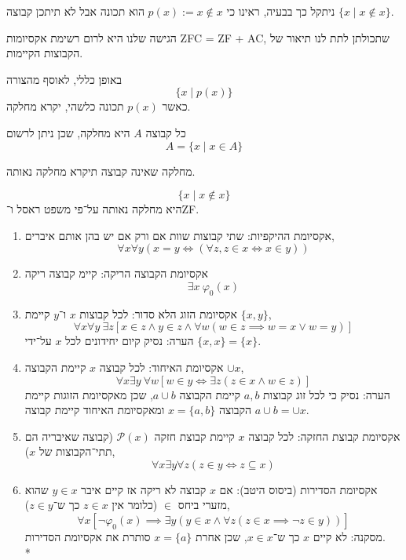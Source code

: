 ניתקל כך בבעיה, ראינו כי $p(x) := x \notin x$ הוא תכונה אבל לא תיתכן קבוצה $\{ x \mid x \notin x \}$.

הגישה שלנו היא לרום רשימת אקסיומות ZFC = ZF + AC, שתכולתן לתת לנו תיאור של הקבוצות הקיימות.
\begin{remark}
	באופן כללי, לאוסף מהצורה
	\[
		\{ x \mid p(x) \}
	\]
	כאשר $p(x)$ תכונה כלשהי, יקרא מחלקה.
\end{remark}
\begin{remark}
	כל קבוצה $A$ היא מחלקה, שכן ניתן לרשום
	\[
		A = \{ x \mid x \in A \}
	\]
\end{remark}
מחלקה שאינה קבוצה תיקרא מחלקה נאותה.
\begin{example}
	\[
		\{ x \mid x \notin x\}
	\]
	היא מחלקה נאותה על־פי משפט ראסל ו־ZF. %
\end{example}
\begin{definition}[המערכת ZF]
	\begin{enumerate}
		\item אקסיומת ההיקפיות:
			שתי קבוצות שוות אם ורק אם יש בהן אותם איברים,
			\[
				\forall x \forall y ( x = y \iff (\forall z, z \in x \iff x \in y))
			\]
		\item אקסיומת הקבוצה הריקה:
			קיימ קבוצה ריקה
			\[
				\exists x\ \varphi_0(x)
			\]
		\item אקסיומת הזוג הלא סדור:
			לכל קבוצות $x$ ו־$y$ קיימת $\{x, y\}$,
			\[
				\forall x \forall y \ \exists z [ x \in z \land y \in z \land \forall w (w \in z \implies w = x \lor w = y)]
			\]
			הערה: נסיק קיום יחידונים לכל $x$ על־ידי $\{ x, x \} = \{ x \}$.
		\item אקסיומת האיחוד:
			לכל קבוצה $x$ קיימת הקבוצה $\cup x$,
			\[
				\forall x \exists y \ \forall w [w \in y \iff \exists z (z \in x \land w \in z)]
			\]
			הערה: נסיק כי לכל זוג קבוצות $a, b$ קיימת הקבוצה $a \cup b$, שכן מאקסיומת הזוגות קיימת הקבוצה $x = \{ a, b \}$ ומאקסיומת האיחוד קיימת קבוצה $a \cup b = \cup x$.
		\item אקסיומת קבוצת החזקה:
			לכל קבוצה $x$ קיימת קבוצת חזקה $\mathcal{P}(x)$ (קבוצה שאיבריה הם תתי־הקבוצות של $x$),
			\[
				\forall x\exists y \forall z (z \in y \iff z \subseteq x)
			\]
		\item אקסיומת הסדירות (ביסוס היטב):
			אם $x$ קבוצה לא ריקה אז קיים איבר $y \in x$ שהוא מזערי ביחס $\in$ (כלומר אין $z \in x$ כך ש־$z \in y$),
			\[
				\forall x [ \lnot \varphi_0(x) \implies \exists y ( y \in x \land \forall z (z \in x \implies \lnot z \in y))]
			\]
			מסקנה: לא קיים $x$ כך ש־$x \in x$, שכן אחרת $x = \{ a \}$ סותרת את אקסיומת הסדירות. \\*

\end{enumerate}
\end{definition}
